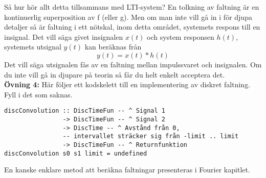\documentclass{article}
\begin{document}

Så hur hör allt detta tillsammans med LTI-system? En tolkning av faltning
är en kontinuerlig superposition av f (eller g). Men om man inte vill gå in
i för djupa detaljer så är faltning i ett nötskal, inom detta området,
systemets respons till en insignal. Det vill säga givet insignalen $x(t)$
och system responsen $h(t)$, systemets utsignal $y(t)$ kan beräknas från
$$y(t) = x(t) * h(t) $$
Det vill säga utsignalen fås av en faltning mellan impulssvaret och insignalen. Om du inte vill gå in djupare på teorin så får du helt enkelt acceptera det.
\\

\textbf{Övning 4:}
Här följer ett kodskelett till en implementering av diskret faltning. Fyll i det som saknas.
\begin{verbatim}
discConvolution :: DiscTimeFun -- ^ Signal 1
                -> DiscTimeFun -- ^ Signal 2
                -> DiscTime -- ^ Avstånd från 0,
                -- intervallet sträcker sig från -limit .. limit
                -> DiscTimeFun -- ^ Returnfunktion
discConvolution s0 s1 limit = undefined
\end{verbatim}
En kanske enklare metod att beräkna faltningar presenteras i Fourier kapitlet.
\newpage
\end{document}
